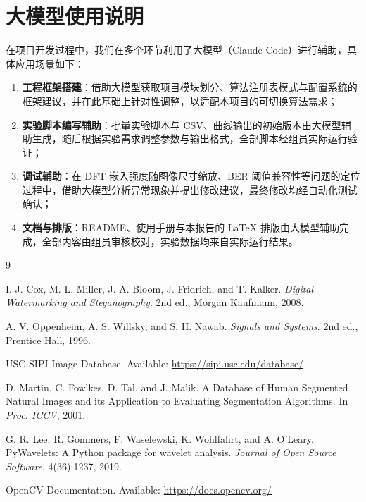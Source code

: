 \documentclass[11pt]{ctexart}
\begin{document}
\section{大模型使用说明}

在项目开发过程中，我们在多个环节利用了大模型（Claude Code）进行辅助，具体应用场景如下：

\begin{enumerate}
  \item \textbf{工程框架搭建}：借助大模型获取项目模块划分、算法注册表模式与配置系统的框架建议，并在此基础上针对性调整，以适配本项目的可切换算法需求；
  \item \textbf{实验脚本编写辅助}：批量实验脚本与 CSV、曲线输出的初始版本由大模型辅助生成，随后根据实验需求调整参数与输出格式，全部脚本经组员实际运行验证；
  \item \textbf{调试辅助}：在 DFT 嵌入强度随图像尺寸缩放、BER 阈值兼容性等问题的定位过程中，借助大模型分析异常现象并提出修改建议，最终修改均经自动化测试确认；
  \item \textbf{文档与排版}：README、使用手册与本报告的 \LaTeX{} 排版由大模型辅助完成，全部内容由组员审核校对，实验数据均来自实际运行结果。
\end{enumerate}

\begin{thebibliography}{9}

 I. J. Cox, M. L. Miller, J. A. Bloom, J. Fridrich, and T. Kalker. \textit{Digital Watermarking and Steganography}. 2nd ed., Morgan Kaufmann, 2008.

 A. V. Oppenheim, A. S. Willsky, and S. H. Nawab. \textit{Signals and Systems}. 2nd ed., Prentice Hall, 1996.

 USC-SIPI Image Database. Available: \url{https://sipi.usc.edu/database/}

 D. Martin, C. Fowlkes, D. Tal, and J. Malik. A Database of Human Segmented Natural Images and its Application to Evaluating Segmentation Algorithms. In \textit{Proc. ICCV}, 2001.

 G. R. Lee, R. Gommers, F. Waselewski, K. Wohlfahrt, and A. O'Leary. PyWavelets: A Python package for wavelet analysis. \textit{Journal of Open Source Software}, 4(36):1237, 2019.

 OpenCV Documentation. Available: \url{https://docs.opencv.org/}

\end{thebibliography}
\end{document}
